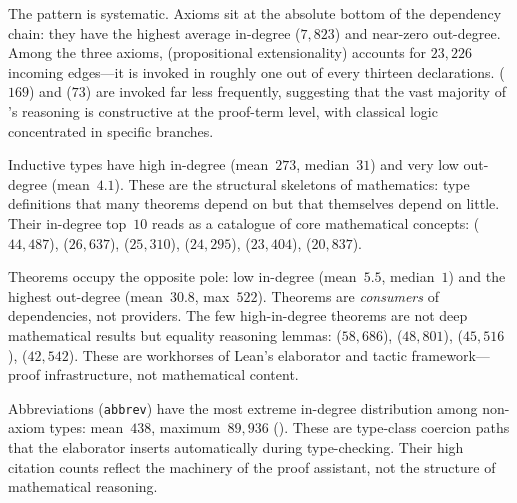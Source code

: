 The pattern is systematic. Axioms sit at the absolute bottom of the dependency chain: they have the highest average in-degree ($7{,}823$) and near-zero out-degree. Among the three axioms,  (propositional extensionality) accounts for $23{,}226$ incoming edges---it is invoked in roughly one out of every thirteen declarations.  ($169$) and  ($73$) are invoked far less frequently, suggesting that the vast majority of 's reasoning is constructive at the proof-term level, with classical logic concentrated in specific branches.

Inductive types have high in-degree (mean~$273$, median~$31$) and very low out-degree (mean~$4.1$). These are the structural skeletons of mathematics: type definitions that many theorems depend on but that themselves depend on little. Their in-degree top~$10$ reads as a catalogue of core mathematical concepts:  ($44{,}487$),  ($26{,}637$),  ($25{,}310$),  ($24{,}295$),  ($23{,}404$),  ($20{,}837$).

Theorems occupy the opposite pole: low in-degree (mean~$5.5$, median~$1$) and the highest out-degree (mean~$30.8$, max~$522$). Theorems are \emph{consumers} of dependencies, not providers. The few high-in-degree theorems are not deep mathematical results but equality reasoning lemmas:  ($58{,}686$),  ($48{,}801$),  ($45{,}516$),  ($42{,}542$). These are workhorses of Lean's elaborator and tactic framework---proof infrastructure, not mathematical content.

Abbreviations (\texttt{abbrev}) have the most extreme in-degree distribution among non-axiom types: mean~$438$, maximum~$89{,}936$ (). These are type-class coercion paths that the elaborator inserts automatically during type-checking. Their high citation counts reflect the machinery of the proof assistant, not the structure of mathematical reasoning.

